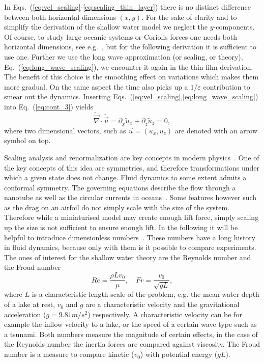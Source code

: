 In Eqs.~(\ref{eq:vel_scaling}-\ref{eq:scaling_thin_layer}) there is no distinct difference between both horizontal dimensions $(x,y)$. 
For the sake of clarity and to simplify the derivation of the shallow water model we neglect the $y$-components.
Of course, to study large oceanic systems or Coriolis forces one needs both horizontal dimensions, see e.g.~\cite{doi:10.1063/1.2116747, MARCHE200749}, but for the following derivation it is sufficient to use one.
Further we use the long wave approximation (or scaling, or theory), Eq.~(\ref{eq:long_wave_scaling}), we encounter it again in the thin film derivation.
The benefit of this choice is the smoothing effect on variations which makes them more gradual. 
On the same aspect the time also picks up a $1/\varepsilon$ contribution to smear out the dynamics.
Inserting Eqs.~(\ref{eq:vel_scaling},\ref{eq:long_wave_scaling}) into Eq.~(\ref{eq:cont_3}) yields
\begin{equation}\label{eq:rescaled_cont}
    \tilde{\vec{\nabla}}\cdot\tilde{\vec{u}} = \partial_{\tilde{x}} \tilde{u}_x + \partial_{\tilde{z}} \tilde{u}_z  = 0,
\end{equation}
where two dimensional vectors, such as $\vec{u} = (u_x, u_z)$ are denoted with an arrow symbol on top.

Scaling analysis and renormalization are key concepts in modern physics~\cite{yakhot1986renormalization, peskin2018introduction}.
One of the key concepts of this idea are symmetries, and therefore transformations under which a given state does not change.
Fluid dynamics to some extent admits a conformal symmetry.
The governing equations describe the flow through a nanotube as well as the circular currents in oceans~\cite{Secchi2016, MARCHE200749}.
Some features however such as the drag on an airfoil do not simply scale with the size of the system.
Therefore while a miniaturised model may create enough lift force, simply scaling up the size is not sufficient to ensure enough lift.  
In the following it will be helpful to introduce dimensionless numbers~\cite{ruzicka2008dimensionless,de1991fluid}.
These numbers have a long history in fluid dynamics, because only with them is it possible to compare experiments.
The ones of interest for the shallow water theory are the Reynolds number and the Froud number
\begin{equation}\label{eq:Re_and_Fr}
    Re = \frac{\rho L v_0}{\mu},\quad Fr = \frac{v_0}{\sqrt{g L}},
\end{equation}
where $L$ is a characteristic length scale of the problem, e.g. the mean water depth of a lake at rest, $v_0$ and $g$ are a characteristic velocity and the gravitational acceleration ($g = 9.81 m/s^2$) respectively.
A characteristic velocity can be for example the inflow velocity to a lake, or the speed of a certain wave type such as a tsunami.
Both numbers measure the magnitude of certain effects, in the case of the Reynolds number the inertia forces are compared against viscosity.
The Froud number is a measure to compare kinetic ($v_0$) with potential energy ($g L$).

